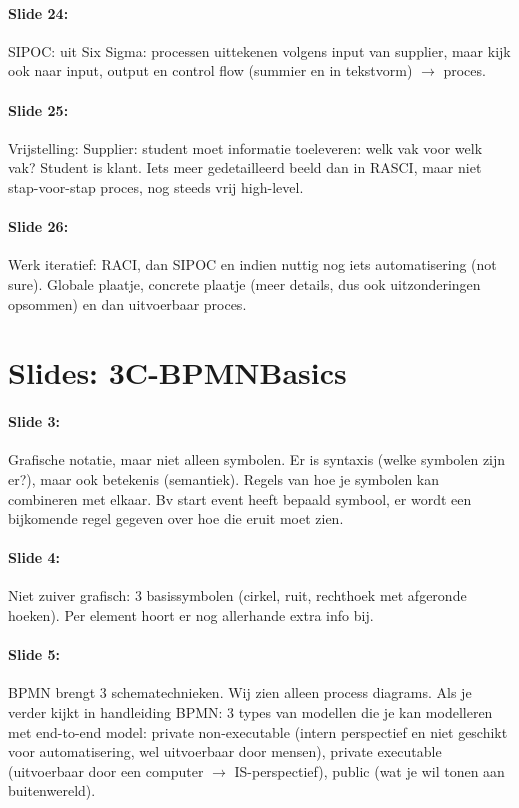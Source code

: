 \documentclass[10pt,a4paper]{report}
\begin{document}
\paragraph{Slide 24:}SIPOC: uit Six Sigma: processen uittekenen volgens input van supplier, maar kijk ook naar input, output en control flow (summier en in tekstvorm) $\rightarrow$ proces.

\paragraph{Slide 25:}Vrijstelling:
Supplier: student moet informatie toeleveren: welk vak voor welk vak?
Student is klant.
Iets meer gedetailleerd beeld dan in RASCI, maar niet stap-voor-stap proces, nog steeds vrij high-level.

\paragraph{Slide 26:}Werk iteratief: RACI, dan SIPOC en indien nuttig nog iets  automatisering (not sure).
Globale plaatje, concrete plaatje (meer details, dus ook uitzonderingen opsommen) en dan uitvoerbaar proces.

\section{Slides: 3C-BPMNBasics}
\paragraph{Slide 3:}Grafische notatie, maar niet alleen symbolen. Er is syntaxis (welke symbolen zijn er?), maar ook betekenis (semantiek). Regels van hoe je symbolen kan combineren met elkaar. Bv start event heeft bepaald symbool, er wordt een bijkomende regel gegeven over hoe die eruit moet zien.

\paragraph{Slide 4:}Niet zuiver grafisch: 3 basissymbolen (cirkel, ruit, rechthoek met afgeronde hoeken). Per element hoort er nog allerhande extra info bij.

\paragraph{Slide 5:}BPMN brengt 3 schematechnieken. Wij zien alleen process diagrams. Als je verder kijkt in handleiding BPMN: 3 types van modellen die je kan modelleren met end-to-end model: private non-executable (intern perspectief en niet geschikt voor automatisering, wel uitvoerbaar door mensen), private executable (uitvoerbaar door een computer $\rightarrow$ IS-perspectief), public (wat je wil tonen aan buitenwereld).
\end{document}
